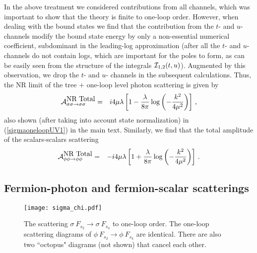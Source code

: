 \documentclass[11pt]{article}
\begin{document}
In the above treatment we considered contributions from all channels, which was important to show that the theory is finite to one-loop order. However, when dealing with the bound states we find that the contribution from the $t$- and $u$- channels modify the bound state energy by only a non-essential numerical coefficient, subdominant in the leading-log approximation (after all the $t$- and $u$- channels do not contain logs, which are important for the poles to form, as can be easily seen from the structure of the integrals ${\cal I}_{1,2}(t,u)$). Augmented by this observation, we drop the $t$- and $u$- channels in the subsequent calculations. 
Thus, the NR limit of the tree $+$ one-loop level photon scattering is given by
%
\begin{eqnarray}
\label{appxresult1}
{\cal A}^{\mbox{NR Total}}_{\sigma\sigma \rightarrow \sigma\sigma}&=&i4\mu\lambda\left[1-\frac{\lambda}{8\pi}\log\left(-\frac{k^2}{4\mu^2}\right) \right]\,,
\end{eqnarray}
%
also shown (after taking into account state normalization) in (\ref{sigmaoneloopUV1}) in the main text.
Similarly, we find that the total amplitude of the scalars-scalars scattering
%
\begin{eqnarray}
{\cal A}^{\mbox{NR Total}}_{\phi\phi \rightarrow \phi\phi}&=&-i4\mu\lambda\left[1+\frac{\lambda}{8\pi}\log\left(-\frac{k^2}{4\mu^2}\right) \right]\,.
\end{eqnarray}
%

 

\subsection*{Fermion-photon and fermion-scalar scatterings}

\begin{figure}[t] %
   \centering
   \texttt{[image: sigma\_chi.pdf]} 
   \caption{The scattering  $\sigma~F_{s_2}\rightarrow \sigma~F_{s_4}$ to one-loop order. The one-loop scattering diagrams of $\phi~F_{s_2}\rightarrow \phi~F_{s_4}$ are identical. There are also two ``octopus" diagrams (not shown) that cancel each other.}
	\label{sigma chi one loop}
\end{figure}
\end{document}
